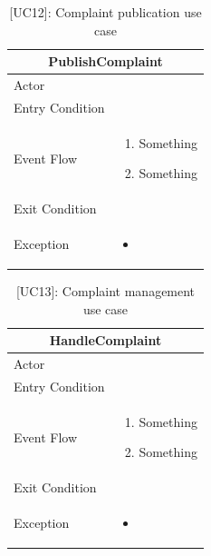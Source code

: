 \begin{table}[H]
    \centering
    \begin{tabular}{|p{3cm}|p{12cm}|}
    \hline
    \multicolumn{2}{|c|}{\textbf{PublishComplaint}} \\ \hline
    Actor & \\ \hline
    Entry Condition & \\ \hline
    Event Flow &      
    \begin{enumerate}         
        \item Something
        \item Something
    \end{enumerate} \\ \hline
    Exit Condition & \\ \hline
    Exception & 
    \begin{itemize}       
        \item   
    \end{itemize} \\ \hline
    \end{tabular}
    \caption{[UC12]: Complaint publication use case}
    \label{tab:UC12}
\end{table}

\begin{table}[H]
    \centering
    \begin{tabular}{|p{3cm}|p{12cm}|}
    \hline
    \multicolumn{2}{|c|}{\textbf{HandleComplaint}} \\ \hline
    Actor & \\ \hline
    Entry Condition & \\ \hline
    Event Flow &      
    \begin{enumerate}         
        \item Something
        \item Something
    \end{enumerate} \\ \hline
    Exit Condition & \\ \hline
    Exception & 
    \begin{itemize}         
        \item    
    \end{itemize} \\ \hline    
    \end{tabular}
    \caption{[UC13]: Complaint management use case}
    \label{tab:UC13}
\end{table}

